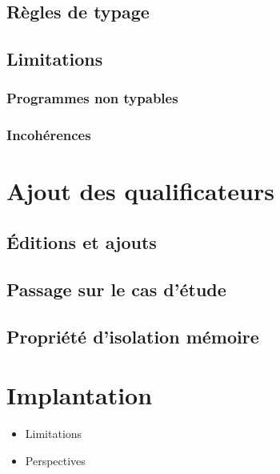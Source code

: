 \documentclass{phdthesis}
\begin{document}
\section{Règles de typage}
\section{Limitations}
\subsection{Programmes non typables}
\subsection{Incohérences}

\chapter{Ajout des qualificateurs}

\section{Éditions et ajouts}
\section{Passage sur le cas d'étude}
\section{Propriété d'isolation mémoire}

\chapter{Implantation}


\begin{itemize}
  \item Limitations
  \item Perspectives
\end{itemize}



\end{document}
